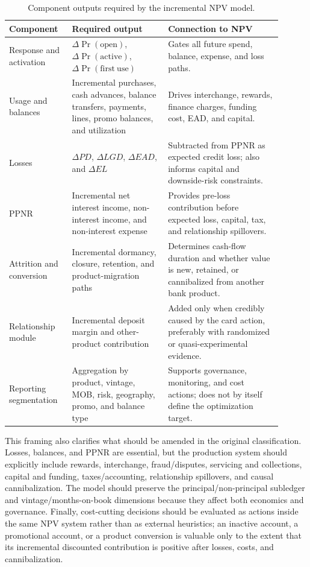 \documentclass[11pt]{article}
\newcommand{\1}{\mathbf{1}}
\begin{document}
\begin{table}[t]
\centering
\caption{Component outputs required by the incremental NPV model.}
\label{tab:component-to-npv}
\begin{tabular}{p{0.20\linewidth}p{0.32\linewidth}p{0.38\linewidth}}
\toprule
Component & Required output & Connection to NPV \\
\midrule
Response and activation
  & $\Delta\Pr(\mathrm{open})$, $\Delta\Pr(\mathrm{active})$,
    $\Delta\Pr(\mathrm{first\ use})$
  & Gates all future spend, balance, expense, and loss paths. \\
Usage and balances
  & Incremental purchases, cash advances, balance transfers, payments, lines,
    promo balances, and utilization
  & Drives interchange, rewards, finance charges, funding cost, EAD, and
    capital. \\
Losses
  & $\Delta PD$, $\Delta LGD$, $\Delta EAD$, and $\Delta EL$
  & Subtracted from PPNR as expected credit loss; also informs capital and
    downside-risk constraints. \\
PPNR
  & Incremental net interest income, non-interest income, and non-interest
    expense
  & Provides pre-loss contribution before expected loss, capital, tax, and
    relationship spillovers. \\
Attrition and conversion
  & Incremental dormancy, closure, retention, and product-migration paths
  & Determines cash-flow duration and whether value is new, retained, or
    cannibalized from another bank product. \\
Relationship module
  & Incremental deposit margin and other-product contribution
  & Added only when credibly caused by the card action, preferably with
    randomized or quasi-experimental evidence. \\
Reporting segmentation
  & Aggregation by product, vintage, MOB, risk, geography, promo, and balance
    type
  & Supports governance, monitoring, and cost actions; does not by itself
    define the optimization target. \\
\bottomrule
\end{tabular}
\end{table}

This framing also clarifies what should be amended in the original
classification. Losses, balances, and PPNR are essential, but the production
system should explicitly include rewards, interchange, fraud/disputes,
servicing and collections, capital and funding, taxes/accounting, relationship
spillovers, and causal cannibalization. The model should preserve the
principal/non-principal subledger and vintage/months-on-book dimensions because
they affect both economics and governance. Finally, cost-cutting decisions
should be evaluated as actions inside the same NPV system rather than as
external heuristics; an inactive account, a promotional account, or a product
conversion is valuable only to the extent that its incremental discounted
contribution is positive after losses, costs, and cannibalization.
\end{document}
